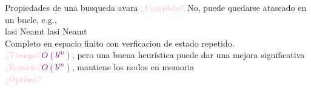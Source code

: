     \begin{frame}{Propiedades de una busqueda avara}
        \textcolor{Pink}{¿Completo?} No, puede quedarse atascado en un bucle, e.g.,\\
        lasi \longrightarrow Neamt \longrightarrow lasi \longrightarrow Neamt \longrightarrow\\
        Completo en espacio finito con verficacion de estado repetido.\\
        \textcolor{Pink}{¿Tiempo?}\textcolor{Purple}{$O(b^m)$}, pero una buena heurística puede dar una mejora significativa\\
        \textcolor{Pink}{¿Espacio?}\textcolor{Purple}{$O(b^m)$}, mantiene los nodos en memoria\\
        \textcolor{Pink}{¿Optimo?}
    \end{frame}